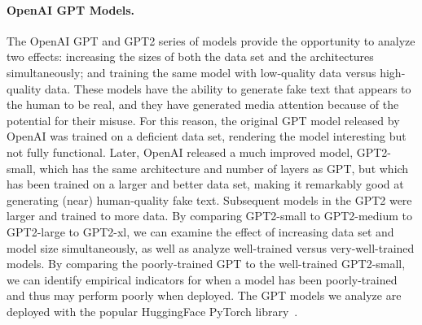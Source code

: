 \paragraph{OpenAI GPT Models.}

The OpenAI GPT and GPT2 series of models provide the opportunity to analyze two effects: increasing the sizes of both the data set and the architectures simultaneously; and training the same model with low-quality data versus high-quality data. 
These models have the ability to generate fake text that appears to the human to be real, and they have generated media attention because of the potential for their misuse.
For this reason, the original GPT model released by OpenAI was trained on a deficient data set, rendering the model interesting but not fully functional.  
Later, OpenAI released a much improved model, GPT2-small, which has the same architecture and number of layers as GPT, but which has been trained on a larger and better data set, making it remarkably good at generating (near) human-quality fake text.  
Subsequent models in the GPT2 were larger and trained to more data.
By comparing GPT2-small to GPT2-medium to GPT2-large to GPT2-xl, we can examine the effect of increasing data set and model size simultaneously, as well as analyze well-trained versus very-well-trained models.
By comparing the poorly-trained GPT to the well-trained GPT2-small, we can identify empirical indicators for when a model has been poorly-trained and thus may perform poorly when deployed.
The GPT models we analyze are deployed with the popular HuggingFace PyTorch library~\cite{huggingface}.


